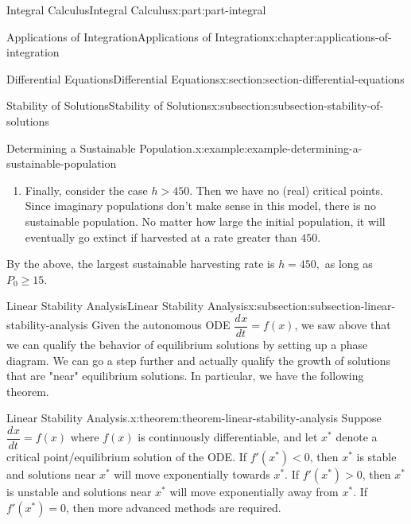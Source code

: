 \documentclass[twoside,10pt,]{tufte-book}
\newcommand{\terminology}[1]{\textbf{#1}}
\numberwithin{equation}{part}
\newcommand{\dv}[3][]{\dfrac{d^{#1} #2}{d #3^{#1}}}
\newcommand{\lt}{<}
\newcommand{\gt}{>}
\begin{document}
\begin{partptx}{Integral Calculus}{}{Integral Calculus}{}{}{x:part:part-integral}
\begin{chapterptx}{Applications of Integration}{}{Applications of Integration}{}{}{x:chapter:applications-of-integration}
\begin{sectionptx}{Differential Equations}{}{Differential Equations}{}{}{x:section:section-differential-equations}
\begin{subsectionptx}{Stability of Solutions}{}{Stability of Solutions}{}{}{x:subsection:subsection-stability-of-solutions}
\begin{example}{Determining a Sustainable Population.}{x:example:example-determining-a-sustainable-population}
\begin{enumerate}
\begin{figureptx}{Phase diagram for \(h\) = 450.}{x:figure:figure-phase-diagram-equal-450}{}
\begin{image}{0.25}{0.5}{0.25}
{
}%
\end{image}%
\tcblower
\end{figureptx}%
We interpret the phase diagram as follows: if \(P\) is less than 15,000%
 then the population will collapse to extinction. Otherwise, the population will stabilize at \(15,000\). This type of critical point is often called \terminology{semi-stable.}%
\item{}Finally, consider the case \(h \gt 450\). Then we have no (real) critical points. Since imaginary populations don't make sense in this model, there is no sustainable population. No matter how large the initial population, it will eventually go extinct if harvested at a rate greater than \(450\).%
\end{enumerate}
By the above, the largest sustainable harvesting rate is \(h = 450,\) as long as \(P_{0}\geq 15\).%
\end{example}
\end{subsectionptx}
%
%
\typeout{************************************************}
\typeout{************************************************}
%
\begin{subsectionptx}{Linear Stability Analysis}{}{Linear Stability Analysis}{}{}{x:subsection:subsection-linear-stability-analysis}
Given the autonomous ODE \(\dv{x}{t} = f(x)\), we saw above that we can qualify the behavior of equilibrium solutions by setting up a phase diagram. We can go a step further and actually qualify the growth of solutions that are "near" equilibrium solutions. In particular, we have the following theorem.%
\begin{theorem}{Linear Stability Analysis.}{}{x:theorem:theorem-linear-stability-analysis}%
Suppose \(\dv{x}{t} = f(x)\) where \(f(x)\) is continuously differentiable, and let \(x^{*}\) denote a critical point\slash{}equilibrium solution of the ODE. If \(f'(x^{*}) \lt 0\), then \(x^{*}\) is stable and solutions near \(x^{*}\) will move exponentially towards \(x^{*}\). If \(f'(x^{*}) \gt 0\), then \(x^{*}\) is unstable and solutions near \(x^{*}\) will move exponentially away from \(x^{*}\). If \(f'(x^{*}) = 0\), then more advanced methods are required.%

\end{theorem}
\end{subsectionptx}
\end{sectionptx}
\end{chapterptx}
\end{partptx}
\end{document}
